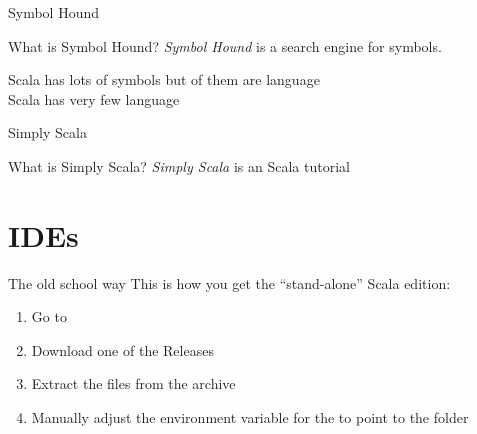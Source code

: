
\begin{frame}{Symbol Hound}
\begin{center}
\end{center}
\begin{center}
\begin{block}{What is Symbol Hound?}
\emph{Symbol Hound} is a search engine for symbols.
\end{block}
\begin{center}
Scala has lots of \alert{symbols} but  of them are language
\\
Scala has very few language 
\end{center}
\end{center}
\end{frame}

\begin{frame}{Simply Scala}
\begin{center}
\end{center}
\begin{block}{What is Simply Scala?}
\emph{Simply Scala} is an  Scala tutorial
\end{block}
\end{frame}

\section{IDEs}
\begin{frame}{The old school way}
This is how you get the ``stand-alone'' Scala edition:
\begin{enumerate}
  \item Go to
  \item Download one of the  Releases
  \item Extract the files from the archive
  \item Manually adjust the environment variable for the  to
  point to the  folder
\end{enumerate}
\end{frame}

